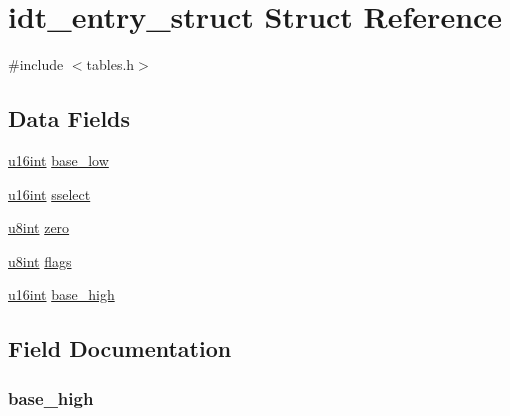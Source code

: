 \hypertarget{structidt__entry__struct}{}\section{idt\+\_\+entry\+\_\+struct Struct Reference}
\label{structidt__entry__struct}


{\ttfamily \#include $<$tables.\+h$>$}

\subsection*{Data Fields}
\begin{DoxyCompactItemize}
\item 
\hyperlink{system_8h_a863d9497073aad2b991aeab2211d87af}{u16int} \hyperlink{structidt__entry__struct_a0a776dced2c26f16298425cde39f8364}{base\+\_\+low}
\item 
\hyperlink{system_8h_a863d9497073aad2b991aeab2211d87af}{u16int} \hyperlink{structidt__entry__struct_ab3f34507900160b4a9b309b4ed039e07}{sselect}
\item 
\hyperlink{system_8h_a1026e682ffdadc1701c42cd44ce9efcf}{u8int} \hyperlink{structidt__entry__struct_a94515e42687e7508877c09da81f86860}{zero}
\item 
\hyperlink{system_8h_a1026e682ffdadc1701c42cd44ce9efcf}{u8int} \hyperlink{structidt__entry__struct_a138dda98fcd4738346af61bcca8cf4b4}{flags}
\item 
\hyperlink{system_8h_a863d9497073aad2b991aeab2211d87af}{u16int} \hyperlink{structidt__entry__struct_aa5444beb10d8cdc1d75a18d338f1b3ea}{base\+\_\+high}
\end{DoxyCompactItemize}


\subsection{Field Documentation}
\hypertarget{structidt__entry__struct_aa5444beb10d8cdc1d75a18d338f1b3ea}{}
\subsubsection[{base\+\_\+high}]{ base\+\_\+high}\label{structidt__entry__struct_aa5444beb10d8cdc1d75a18d338f1b3ea}
\hypertarget{structidt__entry__struct_a0a776dced2c26f16298425cde39f8364}{}
